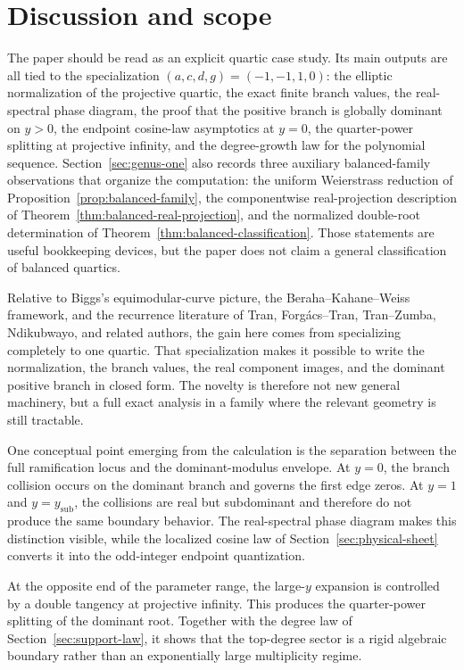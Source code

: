 \section{Discussion and scope}\label{sec:discussion-new}

The paper should be read as an explicit quartic case study.
Its main outputs are all tied to the specialization \((a,c,d,g)=(-1,-1,1,0)\): the elliptic normalization of the projective quartic, the exact finite branch values, the real-spectral phase diagram, the proof that the positive branch is globally dominant on \(y>0\), the endpoint cosine-law asymptotics at \(y=0\), the quarter-power splitting at projective infinity, and the degree-growth law for the polynomial sequence.
Section~\ref{sec:genus-one} also records three auxiliary balanced-family observations that organize the computation: the uniform Weierstrass reduction of Proposition~\ref{prop:balanced-family}, the componentwise real-projection description of Theorem~\ref{thm:balanced-real-projection}, and the normalized double-root determination of Theorem~\ref{thm:balanced-classification}.
Those statements are useful bookkeeping devices, but the paper does not claim a general classification of balanced quartics.

Relative to Biggs's equimodular-curve picture, the Beraha--Kahane--Weiss framework, and the recurrence literature of Tran, Forg\'acs--Tran, Tran--Zumba, Ndikubwayo, and related authors, the gain here comes from specializing completely to one quartic.
That specialization makes it possible to write the normalization, the branch values, the real component images, and the dominant positive branch in closed form.
The novelty is therefore not new general machinery, but a full exact analysis in a family where the relevant geometry is still tractable.

One conceptual point emerging from the calculation is the separation between the full ramification locus and the dominant-modulus envelope.
At \(y=0\), the branch collision occurs on the dominant branch and governs the first edge zeros.
At \(y=1\) and \(y=y_{\mathrm{sub}}\), the collisions are real but subdominant and therefore do not produce the same boundary behavior.
The real-spectral phase diagram makes this distinction visible, while the localized cosine law of Section~\ref{sec:physical-sheet} converts it into the odd-integer endpoint quantization.

At the opposite end of the parameter range, the large-\(y\) expansion is controlled by a double tangency at projective infinity.
This produces the quarter-power splitting of the dominant root.
Together with the degree law of Section~\ref{sec:support-law}, it shows that the top-degree sector is a rigid algebraic boundary rather than an exponentially large multiplicity regime.

